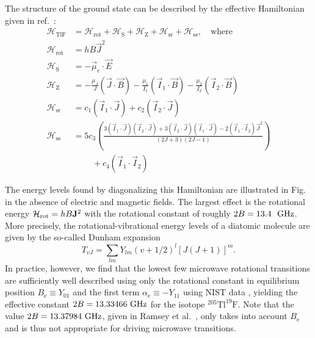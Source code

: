 The structure of the ground state can be described by the effective Hamiltonian
given in ref.\ \cite{wilkening1984search}:
%
\begin{equation}
   \label{TlF_hamiltonian}
\begin{aligned}
    \mathcal{H}_\text{TlF}&=\mathcal H_\text{rot}+\mathcal H_\text{S}+\mathcal H_\text{Z}+\mathcal H_\text{sr}+\mathcal H_\text{ss},\quad\text{where}\\
    \mathcal H_\text{rot}&=h B\vec J^2\\
    \mathcal H_\text{S}&=-\vec\mu_e\cdot\vec E\\
    \mathcal H_\text{Z}&=-\frac{\mu_J}{J}(\vec J\cdot\vec B)-\frac{\mu_1}{I_1}(\vec I_1\cdot\vec B)-\frac{\mu_2}{I_2}(\vec I_2\cdot\vec B)\\
    \mathcal H_\text{sr}&=c_1(\vec I_1\cdot\vec J)+c_2(\vec I_2\cdot\vec J)\\
    \mathcal H_\text{ss}&=5c_3\left(
            \frac{3(\vec I_1\cdot\vec J)(\vec I_2\cdot\vec J)
                +3(\vec I_2\cdot\vec J)(\vec I_1\cdot\vec J)-2(\vec I_1\cdot\vec I_2)\vec J^2}
            {(2J+3)(2J-1)}
        \right)
        \\
        &\mspace{40mu}+c_4(\vec I_1\cdot\vec I_2)
\end{aligned}
\end{equation}

The energy levels found by diagonalizing this Hamiltonian are illustrated in
Fig.~ in the absence of electric and magnetic fields. The largest
effect is the rotational energy $\mathcal{H}_\text{rot}=hB\mathbf{J}^2$ with the rotational
constant of roughly $2B=13.4~~\mathrm{GHz}$. More precisely, the rotational-vibrational
energy levels of a diatomic molecule are given by the so-called Dunham expansion
\cite{huber2013molecular}
%
\[
    T_{vJ}={\textstyle\sum_{lm}}Y_{lm}(v+1/2)^l[J(J+1)]^m.
\]
%
In practice, however, we find that the lowest few microwave rotational
transitions are sufficiently well described using only the rotational constant
in equilibrium position $B_\text{e}\equiv Y_{01}$ and the first term
$\alpha_\text{e}\equiv-Y_{11}$ using NIST data \cite{afeefy2011nist}, yielding
the effective constant $2B=13.33466~\mathrm{GHz}$ for the isotope
$^{205}\mathrm{Tl}^{19}\mathrm{F}$. Note that the value $2B=13.37984~\mathrm{GHz}$, given
in Ramsey et al.\ \cite{wilkening1984search}, only takes into account
$B_\text{e}$ and is thus not appropriate for driving microwave transitions.

